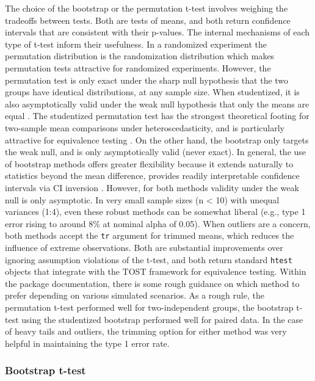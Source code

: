 \documentclass[]{interact}
\theoremstyle{plain}%
\theoremstyle{definition}
\theoremstyle{remark}
\begin{document}
The choice of the bootstrap or the permutation t-test involves weighing
the tradeoffs between tests. Both are tests of means, and both return
confidence intervals that are consistent with their p-values. The
internal mechanisms of each type of t-test inform their usefulness. In a
randomized experiment the permutation distribution is the randomization
distribution which makes permutation tests attractive for randomized
experiments. However, the permutation test is only exact under the sharp
null hypothesis that the two groups have identical distributions, at any
sample size. When studentized, it is also asymptotically valid under the
weak null hypothesis that only the means are equal
\citep{janssen1997, chung2013}. The studentized permutation test has the
strongest theoretical footing for two-sample mean comparisons under
heteroscedasticity, and is particularly attractive for equivalence
testing \citep{Arboretti_Pesarin_Salmaso_2020}. On the other hand, the
bootstrap only targets the weak null, and is only asymptotically valid
(never exact). In general, the use of bootstrap methods offers greater
flexibility because it extends naturally to statistics beyond the mean
difference, provides readily interpretable confidence intervals via CI
inversion \citep{Thulin_2024}. However, for both methods validity under
the weak null is only asymptotic. In very small sample sizes (n
\textless{} 10) with unequal variances (1:4), even these robust methods
can be somewhat liberal (e.g., type 1 error rising to around 8\% at
nominal alpha of 0.05). When outliers are a concern, both methods accept
the \texttt{tr} argument for trimmed means, which reduces the influence
of extreme observations. Both are substantial improvements over ignoring
assumption violations of the t-test, and both return standard
\texttt{htest} objects that integrate with the TOST framework for
equivalence testing. Within the package documentation, there is some
rough guidance on which method to prefer depending on various simulated
scenarios. As a rough rule, the permutation t-test performed well for
two-independent groups, the bootstrap t-test using the studentized
bootstrap performed well for paired data. In the case of heavy tails and
outliers, the trimming option for either method was very helpful in
maintaining the type 1 error rate.

\subsubsection{Bootstrap t-test}\label{bootstrap-t-test}
\end{document}
